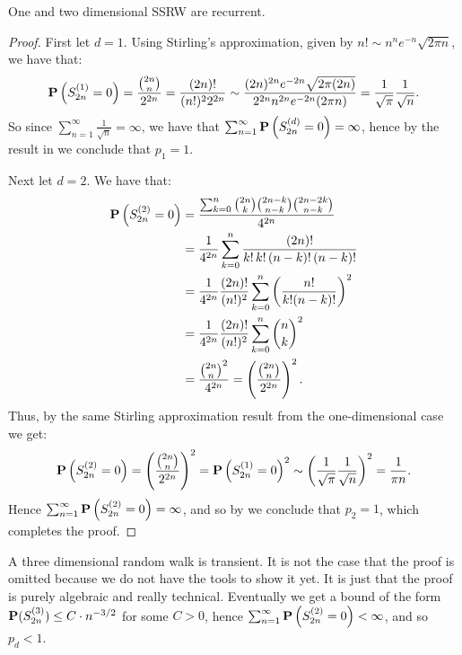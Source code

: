 \documentclass[11pt,a4paper]{article}
\begin{document}
\begin{proposition}
  \label{prop:always-return-home}
  One and two dimensional SSRW are recurrent.
\end{proposition}
\begin{proof}
  First let $d = 1$.
  Using Stirling’s approximation, given by 
  $n! \sim n^n e^{-n} \sqrt{2\pi n}$,
  we have that:
  \[
    \Prob\del{S_{2n}^{(1)} = 0} =
    \frac{\binom{2n}{n}}{2^{2n}} =
    \frac{(2n)!}{(n!)^2 2^{2n}} \sim
    \frac{(2n)^{2n} e^{-2n} \sqrt{2\pi(2n)}}{2^{2n} n^{2n} e^{-2n} (2\pi n)} =
    \frac{1}{\sqrt{\pi}} \frac{1}{\sqrt{n}}.
  \]
  So since $\sum_{n=1}^{\infty} \frac{1}{\sqrt{n}} = \infty$,
  we have that $\sum_{n=1}^{\infty} \Prob\del{S_{2n}^{(d)} = 0} = \infty$,
  hence by the result in  we
  conclude that $p_1 = 1$.

  \noindent
  Next let $d = 2$.
  We have that:
  \begin{align*}
    \Prob\del{S_{2n}^{(2)} = 0} &=
    \frac{\sum_{k=0}^{n}
    \binom{2n}{k}
    \binom{2n-k}{n-k}
    \binom{2n-2k}{n-k}}{4^{2n}} \\ &=
    \frac{1}{4^{2n}}
    \sum_{k=0}^{n} \frac{(2n)!}{k! \, k! \, (n-k)! \, (n-k)!} \\ &=
    \frac{1}{4^{2n}} \frac{(2n)!}{(n!)^2}
    \sum_{k=0}^{n} \del{\frac{n!}{k!(n-k)!}}^2 \\ &=
    \frac{1}{4^{2n}} \frac{(2n)!}{(n!)^2} \sum_{k=0}^{n} \binom{n}{k}^2 \\ &=
    \frac{\binom{2n}{n}^2}{4^{2n}} =
    \del{\frac{\binom{2n}{n}}{2^{2n}}}^2.
  \end{align*}
  Thus, by the same Stirling approximation result from the one-dimensional
  case we get:
  \[
    \Prob\del{S_{2n}^{(2)} = 0} =
    \del{\frac{\binom{2n}{n}}{2^{2n}}}^2 =
    \Prob\del{S_{2n}^{(1)} = 0}^2
    \sim
    \del{\frac{1}{\sqrt{\pi}} \frac{1}{\sqrt{n}}}^2 =
    \frac{1}{\pi n}.
  \]
  Hence $\sum_{n=1}^{\infty} \Prob\del{S_{2n}^{(2)} = 0} = \infty$,
  and so by  we conclude that $p_2 = 1$,
  which completes the proof.
\end{proof}

\begin{remark}
  A three dimensional random walk is transient.
  It is not the case that the proof is omitted because we do not have the tools
  to show it yet.
  It is just that the proof is purely algebraic and really technical.
  Eventually we get a bound of the form
  $\mathbf{P}(S_{2n}^{(3)}) \le C \cdot n^{-3/2}$ for some $C > 0$,
  hence $\sum_{n=1}^{\infty} \Prob\del{S_{2n}^{(2)} = 0} < \infty$,
  and so $p_d < 1$.
\end{remark}
\end{document}

